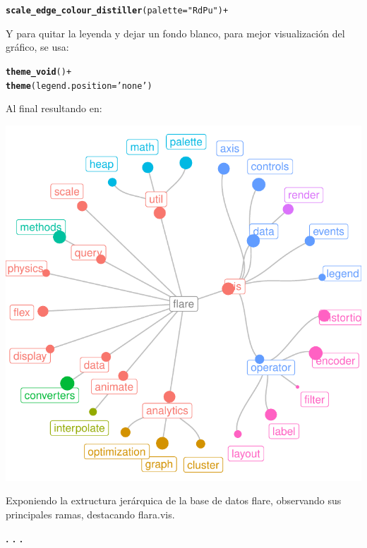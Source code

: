 \documentclass{article}\usepackage[]{graphicx}\usepackage[]{color}
\makeatletter
\def\maxwidth{ %
  \ifdim\Gin@nat@width>\linewidth
    \linewidth
  \else
    \Gin@nat@width
  \fi
}
\newcommand{\hlstr}[1]{\textcolor[rgb]{0.192,0.494,0.8}{#1}}%
\newcommand{\hlopt}[1]{\textcolor[rgb]{0,0,0}{#1}}%
\newcommand{\hlstd}[1]{\textcolor[rgb]{0.345,0.345,0.345}{#1}}%
\newcommand{\hlkwc}[1]{\textcolor[rgb]{0.333,0.667,0.333}{#1}}%
\newcommand{\hlkwd}[1]{\textcolor[rgb]{0.737,0.353,0.396}{\textbf{#1}}}%
\newenvironment{kframe}{%
 \def\at@end@of@kframe{}%
 \ifinner\ifhmode%
  \def\at@end@of@kframe{\end{minipage}}%
  \begin{minipage}{\columnwidth}%
 \fi\fi%
 \def\FrameCommand##1{\hskip\@totalleftmargin \hskip-\fboxsep
 \colorbox{shadecolor}{##1}\hskip-\fboxsep
     \hskip-\linewidth \hskip-\@totalleftmargin \hskip\columnwidth}%
 \MakeFramed {\advance\hsize-\width
   \@totalleftmargin\z@ \linewidth\hsize
   \@setminipage}}%
 {\par\unskip\endMakeFramed%
 \at@end@of@kframe}
\newenvironment{knitrout}{}{} %
\makeatother
\begin{document}
\begin{knitrout}
\color{fgcolor}\begin{kframe}
\begin{alltt}
  \hlkwd{scale_edge_colour_distiller}(palette = \hlstr{"RdPu"}) +
\end{alltt}
\end{kframe}
\end{knitrout}
Y para quitar la leyenda y dejar un fondo blanco, para mejor visualizaci\'on del gr\'afico, se usa:
\begin{knitrout}
\color{fgcolor}\begin{kframe}
\begin{alltt}
  \hlkwd{theme_void}\hlstd{()} \hlopt{+}
  \hlkwd{theme}\hlstd{(}\hlkwc{legend.position} \hlstd{=} \hlstr{'none'}\hlstd{)}
\end{alltt}
\end{kframe}
\end{knitrout}
\clearpage
Al final resultando en:
\begin{knitrout}
\color{fgcolor}

{\centering \includegraphics[width=\maxwidth]{figure/grafo_ggrpah-1} 

}



\end{knitrout}
Exponiendo la extructura jer\'arquica de la base de datos flare, observando sus principales ramas, destacando flara.vis.
\begin{center}
\textbf{. . .}
\end{center}
\end{document}
